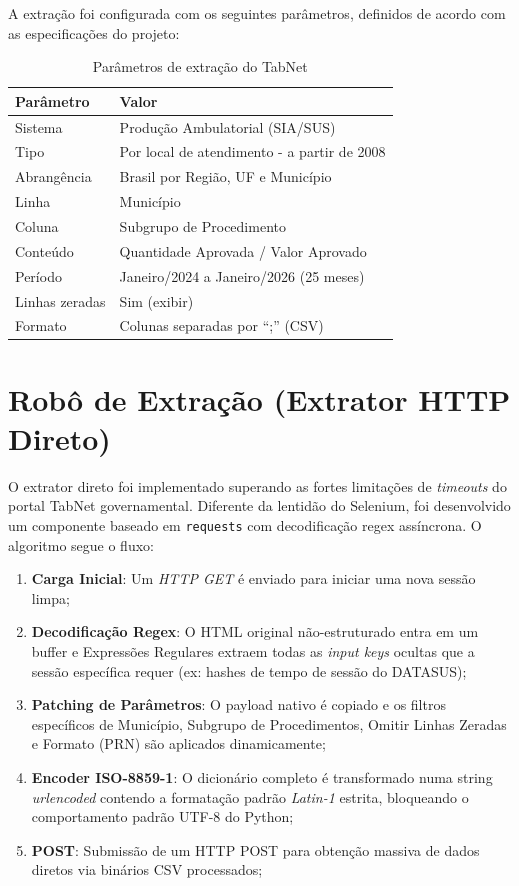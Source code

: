 \documentclass[
    12pt,
    oneside,
    a4paper,
    chapter=TITLE,
    section=TITLE
]{abntex2}
\begin{document}
A extração foi configurada com os seguintes parâmetros, definidos de acordo com as especificações do projeto:

\begin{table}[H]
\centering
\caption{Parâmetros de extração do TabNet}
\label{tab:parametros}
\begin{tabular}{ll}
\toprule
\textbf{Parâmetro} & \textbf{Valor} \\
\midrule
Sistema & Produção Ambulatorial (SIA/SUS) \\
Tipo & Por local de atendimento - a partir de 2008 \\
Abrangência & Brasil por Região, UF e Município \\
Linha & Município \\
Coluna & Subgrupo de Procedimento \\
Conteúdo & Quantidade Aprovada / Valor Aprovado \\
Período & Janeiro/2024 a Janeiro/2026 (25 meses) \\
Linhas zeradas & Sim (exibir) \\
Formato & Colunas separadas por ``;'' (CSV) \\
\bottomrule
\end{tabular}
\end{table}

\section{Robô de Extração (Extrator HTTP Direto)}

O extrator direto foi implementado superando as fortes limitações de \textit{timeouts} do portal TabNet governamental. Diferente da lentidão do Selenium, foi desenvolvido um componente baseado em \texttt{requests} com decodificação regex assíncrona. O algoritmo segue o fluxo:

\begin{enumerate}
    \item \textbf{Carga Inicial}: Um \textit{HTTP GET} é enviado para iniciar uma nova sessão limpa;
    \item \textbf{Decodificação Regex}: O HTML original não-estruturado entra em um buffer e Expressões Regulares extraem todas as \textit{input keys} ocultas que a sessão específica requer (ex: hashes de tempo de sessão do DATASUS);
    \item \textbf{Patching de Parâmetros}: O payload nativo é copiado e os filtros específicos de Município, Subgrupo de Procedimentos, Omitir Linhas Zeradas e Formato (PRN) são aplicados dinamicamente;
    \item \textbf{Encoder ISO-8859-1}: O dicionário completo é transformado numa string \textit{urlencoded} contendo a formatação padrão \textit{Latin-1} estrita, bloqueando o comportamento padrão UTF-8 do Python;
    \item \textbf{POST}: Submissão de um HTTP POST para obtenção massiva de dados diretos via binários CSV processados;
\end{enumerate}
\end{document}
